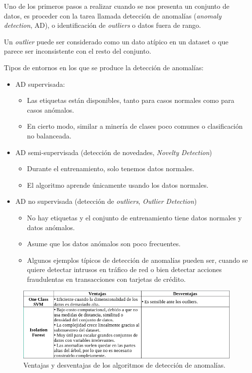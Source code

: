 \documentclass[a4paper,12pt]{article}
\begin{document}
Uno de los primeros pasos a realizar cuando se nos presenta un conjunto de datos, es proceder con la tarea llamada detección de anomalías (\textit{anomaly detection}, AD), o identificación de \textit{outliers} o datos fuera de rango. 

Un \textit{outlier} puede ser considerado como un dato atípico en un dataset o que parece ser inconsistente con el resto del conjunto.

\clearpage

Tipos de entornos en los que se produce la detección de anomalías:
\begin{itemize}[noitemsep, topsep=2pt]
	\item AD supervisada:
	\begin{itemize}[noitemsep, topsep=2pt]
		\item Las etiquetas están disponibles, tanto para casos normales como para casos anómalos.
		\item En cierto modo, similar a minería de clases poco comunes o clasificación no balanceada.
	\end{itemize}
	\item AD semi-supervisada (detección de novedades, \textit{Novelty Detection})
	\begin{itemize}[noitemsep, topsep=2pt]
		\item Durante el entrenamiento, solo tenemos datos normales.
		\item El algoritmo aprende únicamente usando los datos normales.
	\end{itemize}
	\item AD no supervisada (detección de \textit{outliers}, \textit{Outlier Detection})
	\begin{itemize}[noitemsep, topsep=2pt]
		\item No hay etiquetas y el conjunto de entrenamiento tiene datos normales y datos anómalos.
		\item Asume que los datos anómalos son poco frecuentes.
		\item Algunos ejemplos típicos de detección de anomalías pueden ser, cuando se quiere detectar intrusos en tráfico de red o bien detectar acciones fraudulentas en transacciones con tarjetas de crédito.
	\end{itemize}
\end{itemize}

\begin{figure}[H]
	\begin{center}				
	\includegraphics[width=1\textwidth]{tesis_11.png}
  	\caption{Ventajas y desventajas de los algoritmos de detección de anomalías.}
  	\label{fig:proconsanomaly.}
  	\end{center}
\end{figure}
\end{document}
